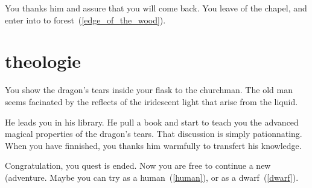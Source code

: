 You thanks him and assure that you will come back. You leave of the chapel, and
enter into to forest~(\ref{edge_of_the_wood}).

\section{theologie}

You show the dragon's tears inside your flask to the churchman. The old man seems
facinated by the reflects of the iridescent light that arise from the liquid.

He leads you in his library. He pull a book and start to teach you the advanced
magical properties of the dragon's tears. That discussion is simply
pationnating. When you have finnished, you thanks him warmfully to transfert his
knowledge.

Congratulation, you quest is ended. Now you are free to continue a new
(adventure. Maybe you can try as a human~(\ref{human}), or as a dwarf~(\ref{dwarf}).
